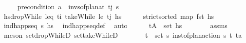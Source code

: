 \begin{isabellebody}
\ \ \ \ \ {\isachardoublequoteopen}{\isacharparenleft}{\kern0pt}precondition\ a{\isacharparenright}{\kern0pt}\ {\isasymin}\ invs{\isacharunderscore}{\kern0pt}of{\isacharunderscore}{\kern0pt}plan{\isacharunderscore}{\kern0pt}at\ t\isactrlsub j\ {\isasympi}s{\isachardoublequoteclose}\isanewline
%
\isadelimproof
\ \ %
\endisadelimproof
%
\isatagproof
{}\isamarkupfalse%
\ {\isacharminus}{\kern0pt}\isanewline
\ \ \ \ \isamarkupfalse%
\ {\isacharquery}{\kern0pt}hs{\isacharprime}{\kern0pt}{\isacharequal}{\kern0pt}{\isachardoublequoteopen}dropWhile\ {\isacharparenleft}{\kern0pt}leq\ t\isactrlsub i{\isacharparenright}{\kern0pt}\ {\isacharparenleft}{\kern0pt}takeWhile\ {\isacharparenleft}{\kern0pt}le\ t\isactrlsub j{\isacharparenright}{\kern0pt}\ hs{\isacharparenright}{\kern0pt}{\isachardoublequoteclose}\isanewline
\ \ \ \ \isamarkupfalse%
\ {\isachardoublequoteopen}strict{\isacharunderscore}{\kern0pt}sorted\ {\isacharparenleft}{\kern0pt}map\ fst\ hs{\isacharparenright}{\kern0pt}{\isachardoublequoteclose}\isanewline
\ \ \ \ \ \ \isamarkupfalse%
\ {\isacartoucheopen}ind{\isacharunderscore}{\kern0pt}happ{\isacharunderscore}{\kern0pt}seq\ {\isasympi}s\ hs{\isacartoucheclose}\ \isamarkupfalse%
\ ind{\isacharunderscore}{\kern0pt}happ{\isacharunderscore}{\kern0pt}seq{\isacharunderscore}{\kern0pt}def\ \isamarkupfalse%
\ auto\isanewline
\ \ \ \ \isamarkupfalse%
\ {\isachardoublequoteopen}{\isacharparenleft}{\kern0pt}t{\isacharcomma}{\kern0pt}A{\isacharparenright}{\kern0pt}\ {\isasymin}\ set\ hs{\isachardoublequoteclose}\isanewline
\ \ \ \ \ \ \isamarkupfalse%
\ assms\ \isamarkupfalse%
\ {\isacharparenleft}{\kern0pt}meson\ set{\isacharunderscore}{\kern0pt}dropWhileD\ set{\isacharunderscore}{\kern0pt}takeWhileD{\isacharparenright}{\kern0pt}\isanewline
\ \ \ \ \isamarkupfalse%
\ \isamarkupfalse%
\ {\isachardoublequoteopen}{\isasymexists}{\isacharparenleft}{\kern0pt}t\isactrlsub {\isasympi}{\isacharcomma}{\kern0pt}{\isasympi}{\isacharparenright}{\kern0pt}\ {\isasymin}\ set\ {\isasympi}s{\isachardot}{\kern0pt}\ inst{\isacharunderscore}{\kern0pt}of{\isacharunderscore}{\kern0pt}plan{\isacharunderscore}{\kern0pt}action\ {\isasympi}s\ {\isacharparenleft}{\kern0pt}t\isactrlsub {\isasympi}{\isacharcomma}{\kern0pt}{\isasympi}{\isacharparenright}{\kern0pt}\ {\isacharparenleft}{\kern0pt}t{\isacharcomma}{\kern0pt}a{\isacharparenright}{\kern0pt}{\isachardoublequoteclose}\isanewline

\end{isabellebody}

